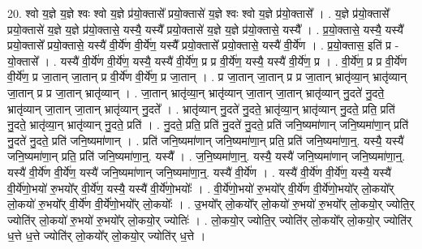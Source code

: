 \documentclass[17pt]{extarticle}
\begin{document}
20. श्वो य॒ज्ञे य॒ज्ञे श्वः श्वो य॒ज्ञे प्र॑यो॒क्तासे᳚ प्रयो॒क्तासे॑ य॒ज्ञे श्वः श्वो य॒ज्ञे प्र॑यो॒क्तासे᳚ । . य॒ज्ञे प्र॑यो॒क्तासे᳚ प्रयो॒क्तासे॑ य॒ज्ञे य॒ज्ञे प्र॑यो॒क्तासे॒ यस्यै॒ यस्यै᳚ प्रयो॒क्तासे॑ य॒ज्ञे य॒ज्ञे प्र॑यो॒क्तासे॒ यस्यै᳚ । . प्र॒यो॒क्तासे॒ यस्यै॒ यस्यै᳚ प्रयो॒क्तासे᳚ प्रयो॒क्तासे॒ यस्यै॑ वी॒र्ये॑ण वी॒र्ये॑ण॒ यस्यै᳚ प्रयो॒क्तासे᳚ प्रयो॒क्तासे॒ यस्यै॑ वी॒र्ये॑ण । . प्र॒यो॒क्तास॒ इति॑ प्र - यो॒क्तासे᳚ । . यस्यै॑ वी॒र्ये॑ण वी॒र्ये॑ण॒ यस्यै॒ यस्यै॑ वी॒र्ये॑ण॒ प्र प्र वी॒र्ये॑ण॒ यस्यै॒ यस्यै॑ वी॒र्ये॑ण॒ प्र । . वी॒र्ये॑ण॒ प्र प्र वी॒र्ये॑ण वी॒र्ये॑ण॒ प्र जा॒तान् जा॒तान् प्र वी॒र्ये॑ण वी॒र्ये॑ण॒ प्र जा॒तान् । . प्र जा॒तान् जा॒तान् प्र प्र जा॒तान् भ्रातृ॑व्या॒न् भ्रातृ॑व्यान् जा॒तान् प्र प्र जा॒तान् भ्रातृ॑व्यान् । . जा॒तान् भ्रातृ॑व्या॒न् भ्रातृ॑व्यान् जा॒तान् जा॒तान् भ्रातृ॑व्यान् नु॒दते॑ नु॒दते॒ भ्रातृ॑व्यान् जा॒तान् जा॒तान् भ्रातृ॑व्यान् नु॒दते᳚ । . भ्रातृ॑व्यान् नु॒दते॑ नु॒दते॒ भ्रातृ॑व्या॒न् भ्रातृ॑व्यान् नु॒दते॒ प्रति॒ प्रति॑ नु॒दते॒ भ्रातृ॑व्या॒न् भ्रातृ॑व्यान् नु॒दते॒ प्रति॑ । . नु॒दते॒ प्रति॒ प्रति॑ नु॒दते॑ नु॒दते॒ प्रति॑ जनि॒ष्यमा॑णान् जनि॒ष्यमा॑णा॒न् प्रति॑ नु॒दते॑ नु॒दते॒ प्रति॑ जनि॒ष्यमा॑णान् । . प्रति॑ जनि॒ष्यमा॑णान् जनि॒ष्यमा॑णा॒न् प्रति॒ प्रति॑ जनि॒ष्यमा॑णा॒न्॒. यस्यै॒ यस्यै॑ जनि॒ष्यमा॑णा॒न् प्रति॒ प्रति॑ जनि॒ष्यमा॑णा॒न्॒. यस्यै᳚ । . ज॒नि॒ष्यमा॑णा॒न्॒. यस्यै॒ यस्यै॑ जनि॒ष्यमा॑णान् जनि॒ष्यमा॑णा॒न्॒. यस्यै॑ वी॒र्ये॑ण वी॒र्ये॑ण॒ यस्यै॑ जनि॒ष्यमा॑णान् जनि॒ष्यमा॑णा॒न्॒. यस्यै॑ वी॒र्ये॑ण । . यस्यै॑ वी॒र्ये॑ण वी॒र्ये॑ण॒ यस्यै॒ यस्यै॑ वी॒र्ये॑णो॒भयो॑ रु॒भयो᳚र् वी॒र्ये॑ण॒ यस्यै॒ यस्यै॑ वी॒र्ये॑णो॒भयोः᳚ । . वी॒र्ये॑णो॒भयो॑ रु॒भयो᳚र् वी॒र्ये॑ण वी॒र्ये॑णो॒भयो᳚र् लो॒कयो᳚र् लो॒कयो॑ रु॒भयो᳚र् वी॒र्ये॑ण वी॒र्ये॑णो॒भयो᳚र् लो॒कयोः᳚ । . उ॒भयो᳚र् लो॒कयो᳚र् लो॒कयो॑ रु॒भयो॑ रु॒भयो᳚र् लो॒कयो॒र् ज्योति॒र् ज्योति॑र् लो॒कयो॑ रु॒भयो॑ रु॒भयो᳚र् लो॒कयो॒र् ज्योतिः॑ । . लो॒कयो॒र् ज्योति॒र् ज्योति॑र् लो॒कयो᳚र् लो॒कयो॒र् ज्योति॑र् ध॒त्ते ध॒त्ते ज्योति॑र् लो॒कयो᳚र् लो॒कयो॒र् ज्योति॑र् ध॒त्ते । \newline
\end{document}
